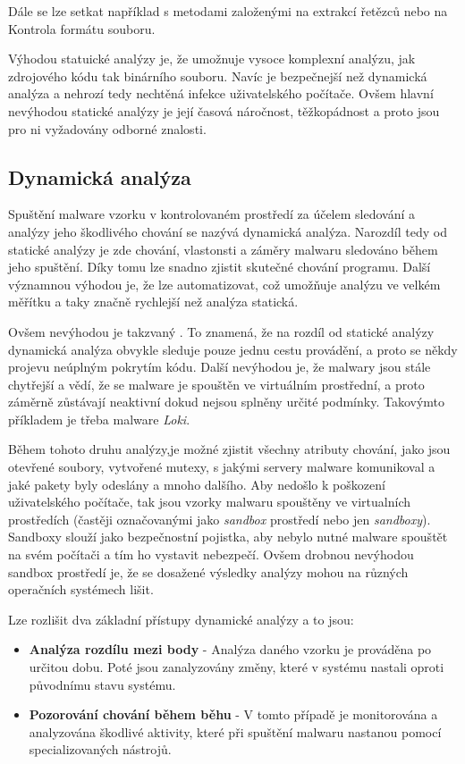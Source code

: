 Dále se lze setkat například s metodami založenými na extrakcí řetězců nebo na Kontrola formátu souboru.

Výhodou statuické analýzy je, že umožnuje vysoce komplexní analýzu, jak zdrojového kódu tak binárního souboru. Navíc je bezpečnejší než dynamická analýza a nehrozí tedy nechtěná infekce uživatelského počítače.
Ovšem hlavní nevýhodou statické analýzy je její časová náročnost, těžkopádnost a proto jsou pro ni vyžadovány odborné znalosti.

\newpage
\subsection*{Dynamická analýza}
Spuštění malware vzorku v kontrolovaném prostředí za účelem sledování a analýzy jeho škodlivého chování se nazývá dynamická analýza.
Narozdíl tedy od statické analýzy je zde chování, vlastonsti a záměry malwaru sledováno během jeho spuštění.
Díky tomu lze snadno zjistit skutečné chování programu. Další významnou výhodou je, že lze automatizovat, což umožňuje analýzu ve velkém měřítku a taky značně rychlejší než analýza statická.

Ovšem nevýhodou je takzvaný . To znamená, že na rozdíl od statické analýzy dynamická analýza obvykle sleduje pouze jednu cestu provádění, a proto se někdy projevu
neúplným pokrytím kódu. Další nevýhodou je, že malwary jsou stále chytřejší a vědí, že se malware je spouštěn ve virtuálním prostřední, a proto záměrně zůstávají neaktivní dokud nejsou splněny určité podmínky. Takovýmto příkladem je třeba malware \textit{Loki}.

Během tohoto druhu analýzy,je možné zjistit všechny atributy chování, jako jsou otevřené soubory, vytvořené mutexy, s jakými servery malware komunikoval a jaké pakety byly odeslány a mnoho dalšího.
Aby nedošlo k poškození uživatelského počítače, tak jsou vzorky malwaru spouštěny ve virtualních prostředích (častěji označovanými jako \textit{sandbox} prostředí nebo jen \textit{sandboxy}). Sandboxy slouží jako bezpečnostní pojistka, aby
nebylo nutné malware spouštět na svém počítači a tím ho vystavit nebezpečí. Ovšem drobnou nevýhodou sandbox prostředí je, že se dosažené výsledky analýzy mohou na různých operačních systémech lišit.

Lze rozlišit dva základní přístupy dynamické analýzy a to jsou:
\begin{itemize}
    \item \textbf{Analýza rozdílu mezi body} - Analýza daného vzorku je prováděna po určitou dobu. Poté jsou zanalyzovány změny, které v systému nastali oproti původnímu stavu systému.
    \item \textbf{Pozorování chování během běhu} - V tomto případě je monitorována a analyzována škodlivé aktivity, které při spuštění malwaru nastanou pomocí specializovaných nástrojů. 
\end{itemize}


